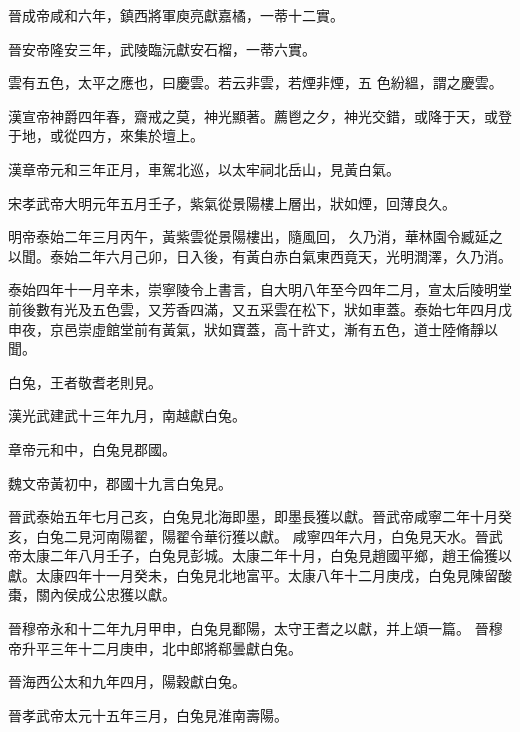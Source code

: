 \begin{pinyinscope}
 晉成帝咸和六年，鎮西將軍庾亮獻嘉橘，一蒂十二實。



 晉安帝隆安三年，武陵臨沅獻安石榴，一蒂六實。



 雲有五色，太平之應也，曰慶雲。若云非雲，若煙非煙，五
 色紛縕，謂之慶雲。



 漢宣帝神爵四年春，齋戒之莫，神光顯著。薦鬯之夕，神光交錯，或降于天，或登于地，或從四方，來集於壇上。



 漢章帝元和三年正月，車駕北巡，以太牢祠北岳山，見黃白氣。



 宋孝武帝大明元年五月壬子，紫氣從景陽樓上層出，狀如煙，回薄良久。



 明帝泰始二年三月丙午，黃紫雲從景陽樓出，隨風回，
 久乃消，華林園令臧延之以聞。泰始二年六月己卯，日入後，有黃白赤白氣東西竟天，光明潤澤，久乃消。



 泰始四年十一月辛未，崇寧陵令上書言，自大明八年至今四年二月，宣太后陵明堂前後數有光及五色雲，又芳香四滿，又五采雲在松下，狀如車蓋。泰始七年四月戊申夜，京邑崇虛館堂前有黃氣，狀如寶蓋，高十許丈，漸有五色，道士陸脩靜以聞。



 白兔，王者敬耆老則見。



 漢光武建武十三年九月，南越獻白兔。



 章帝元和中，白兔見郡國。



 魏文帝黃初中，郡國十九言白兔見。



 晉武泰始五年七月己亥，白兔見北海即墨，即墨長獲以獻。晉武帝咸寧二年十月癸亥，白兔二見河南陽翟，陽翟令華衍獲以獻。
 咸寧四年六月，白兔見天水。晉武帝太康二年八月壬子，白兔見彭城。太康二年十月，白兔見趙國平鄉，趙王倫獲以獻。太康四年十一月癸未，白兔見北地富平。太康八年十二月庚戌，白兔見陳留酸棗，關內侯成公忠獲以獻。



 晉穆帝永和十二年九月甲申，白兔見鄱陽，太守王耆之以獻，并上頌一篇。
 晉穆帝升平三年十二月庚申，北中郎將郗曇獻白兔。



 晉海西公太和九年四月，陽穀獻白兔。



 晉孝武帝太元十五年三月，白兔見淮南壽陽。




\end{pinyinscope}
